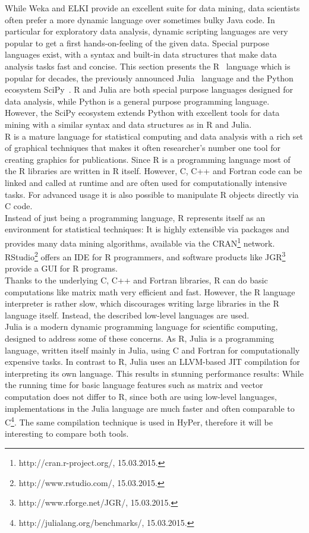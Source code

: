 While Weka and ELKI provide an excellent suite for data mining, data scientists often prefer a more dynamic language over sometimes bulky Java code. In particular for exploratory data analysis, dynamic scripting languages are very popular to get a first hands-on-feeling of the given data. Special purpose languages exist, with a syntax and built-in data structures that make data analysis tasks fast and concise. This section presents the R~\parencite{R/stats} language which is popular for decades, the previously announced Julia~\parencite{DBLP:journals/corr/abs-1209-5145} language and the Python ecosystem SciPy~\parencite{scipy}. R and Julia are both special purpose languages designed for data analysis, while Python is a general purpose programming language. However, the SciPy ecosystem extends Python with excellent tools for data mining with a similar syntax and data structures as in R and Julia.
\\
R is a mature language for statistical computing and data analysis with a rich set of graphical techniques that makes it often researcher's number one tool for creating graphics for publications. Since R is a programming language most of the R libraries are written in R itself. However, C, C++ and Fortran code can be linked and called at runtime and are often used for computationally intensive tasks. For advanced usage it is also possible to manipulate R objects directly via C code.
\\
Instead of just being a programming language, R represents itself as an environment for statistical techniques: It is highly extensible via packages and provides many data mining algorithms, available via the CRAN\footnote{http://cran.r-project.org/, 15.03.2015.} network. RStudio\footnote{http://www.rstudio.com/, 15.03.2015.} offers an IDE for R programmers, and software products like JGR\footnote{http://www.rforge.net/JGR/, 15.03.2015.} provide a GUI for R programs.
\\
Thanks to the underlying C, C++ and Fortran libraries, R can do basic computations like matrix math very efficient and fast. However, the R language interpreter is rather slow, which discourages writing large libraries in the R language itself. Instead, the described low-level languages are used.
\\
Julia is a modern dynamic programming language for scientific computing, designed to address some of these concerns. As R, Julia is a programming language, written itself mainly in Julia, using C and Fortran for computationally expensive tasks. In contrast to R, Julia uses an LLVM-based JIT compilation for interpreting its own language. This results in stunning performance results: While the running time for basic language features such as matrix and vector computation does not differ to R, since both are using low-level languages, implementations in the Julia language are much faster and often comparable to C\footnote{http://julialang.org/benchmarks/, 15.03.2015.}. The same compilation technique is used in HyPer, therefore it will be interesting to compare both tools.
